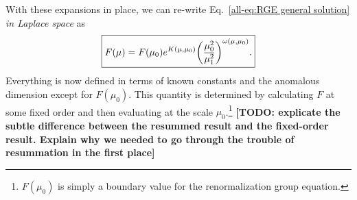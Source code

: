 \documentclass[../thesis.tex]{subfiles}
\begin{document}
	With these expansions in place, we can re-write Eq.~\ref{all-eq:RGE general solution} \textit{in Laplace space} as
	\begin{equation}\label{all-eq:NLL RGE solution Laplace}
	\boxed{
		F(\mu) = F(\mu_0) e^{K(\mu, \mu_0)} \qty(\frac{\mu_0^2}{\mu_1^2})^{\omega(\mu, \mu_0)}.
	}
	\end{equation}
	Everything is now defined in terms of known constants and the anomalous dimension except for $F(\mu_0)$. This quantity is determined by calculating $F$ at some fixed order and then evaluating at the scale $\mu_0$.\footnote{$F(\mu_0)$ is simply a boundary value for the renormalization group equation.} {\color{red}\textbf{[TODO: explicate the subtle difference between the resummed result and the fixed-order result. Explain why we needed to go through the trouble of resummation in the first place]}}
\end{document}
